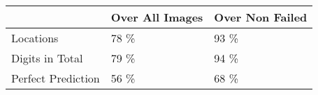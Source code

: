 \begin{tabular}{lll}
\toprule
{} & Over All Images & Over Non Failed \\
\midrule
Locations          &            78 \% &            93 \% \\
Digits in Total    &            79 \% &            94 \% \\
Perfect Prediction &            56 \% &            68 \% \\
\bottomrule
\end{tabular}
